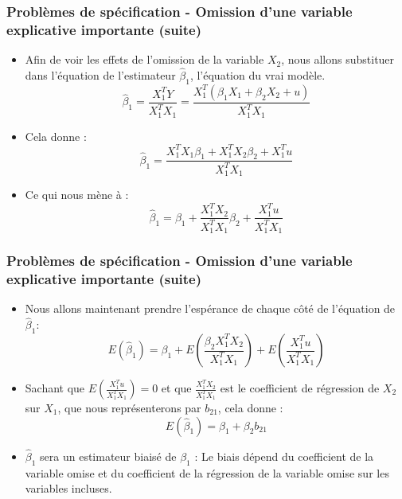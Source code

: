 \documentclass{beamer}
\begin{document}
\begin{frame}
\frametitle{Problèmes de spécification - Omission d’une variable explicative importante (suite)}
\begin{itemize}
    \item Afin de voir les effets de l’omission de la variable \( X_2 \), nous allons substituer dans l’équation de l’estimateur \( \hat{\beta}_1 \), l’équation du vrai modèle.
    \[
    \hat{\beta}_1 = \frac{X_1^T Y}{X_1^T X_1} = \frac{X_1^T (\beta_1 X_1 + \beta_2 X_2 + u)}{X_1^T X_1}
    \]
    \item Cela donne :
    \[
    \hat{\beta}_1 = \frac{X_1^T X_1 \beta_1 + X_1^T X_2 \beta_2 + X_1^T u}{X_1^T X_1}
    \]
    \item Ce qui nous mène à :
    \[
    \hat{\beta}_1 = \beta_1 + \frac{X_1^T X_2}{X_1^T X_1} \beta_2 + \frac{X_1^T u}{X_1^T X_1}
    \]
\end{itemize}
\end{frame}


\begin{frame}
\frametitle{Problèmes de spécification - Omission d’une variable explicative importante (suite)}
\begin{itemize}
    \item Nous allons maintenant prendre l'espérance de chaque côté de l'équation de \( \hat{\beta}_1 \):
    \[
    E(\hat{\beta}_1) = \beta_1 + E\left( \frac{\beta_2 X_1^T X_2}{X_1^T X_1} \right) + E\left( \frac{X_1^T u}{X_1^T X_1} \right)
    \]
    \item Sachant que \( E\left( \frac{X_1^T u}{X_1^T X_1} \right) = 0 \) et que \( \frac{X_1^T X_2}{X_1^T X_1} \) est le coefficient de régression de \( X_2 \) sur \( X_1 \), que nous représenterons par \( b_{21} \), cela donne :
    \[
    E(\hat{\beta}_1) = \beta_1 + \beta_2 b_{21}
    \]
    \item \( \hat{\beta}_1 \) sera un estimateur biaisé de \( \beta_1 \) : Le biais dépend du coefficient de la variable omise et du coefficient de la régression de la variable omise sur les variables incluses.
\end{itemize}
\end{frame}
\end{document}
